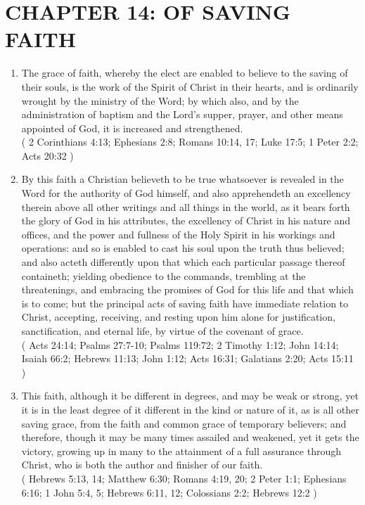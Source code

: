 \documentclass[12pt,a4paper]{book}
\begin{document}
\chapter{CHAPTER 14: OF SAVING FAITH}
\label{ch-sav-fai}
\begin{enumerate}
\item The grace of faith, whereby the elect are enabled to believe to the saving of their souls, is the work of the Spirit of Christ in their hearts, and is ordinarily wrought by the ministry of the Word; by which also, and by the administration of baptism and the Lord's supper, prayer, and other means appointed of God, it is increased and strengthened.\\
( 2 Corinthians 4:13; Ephesians 2:8; Romans 10:14, 17; Luke 17:5; 1 Peter 2:2; Acts 20:32 )
\item By this faith a Christian believeth to be true whatsoever is revealed in the Word for the authority of God himself, and also apprehendeth an excellency therein above all other writings and all things in the world, as it bears forth the glory of God in his attributes, the excellency of Christ in his nature and offices, and the power and fullness of the Holy Spirit in his workings and operations: and so is enabled to cast his soul upon the truth thus believed; and also acteth differently upon that which each particular passage thereof containeth; yielding obedience to the commands, trembling at the threatenings, and embracing the promises of God for this life and that which is to come; but the principal acts of saving faith have immediate relation to Christ, accepting, receiving, and resting upon him alone for justification, sanctification, and eternal life, by virtue of the covenant of grace.\\
( Acts 24:14; Psalms 27:7-10; Psalms 119:72; 2 Timothy 1:12; John 14:14; Isaiah 66:2; Hebrews 11:13; John 1:12; Acts 16:31; Galatians 2:20; Acts 15:11 )
\item This faith, although it be different in degrees, and may be weak or strong, yet it is in the least degree of it different in the kind or nature of it, as is all other saving grace, from the faith and common grace of temporary believers; and therefore, though it may be many times assailed and weakened, yet it gets the victory, growing up in many to the attainment of a full assurance through Christ, who is both the author and finisher of our faith.\\
( Hebrews 5:13, 14; Matthew 6:30; Romans 4:19, 20; 2 Peter 1:1; Ephesians 6:16; 1 John 5:4, 5; Hebrews 6:11, 12; Colossians 2:2; Hebrews 12:2 )
\end{enumerate}
\end{document}
